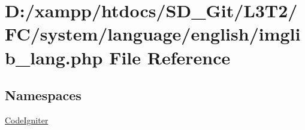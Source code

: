 \hypertarget{system_2language_2english_2imglib__lang_8php}{}\section{D\+:/xampp/htdocs/\+S\+D\+\_\+\+Git/\+L3\+T2/\+F\+C/system/language/english/imglib\+\_\+lang.php File Reference}
\label{system_2language_2english_2imglib__lang_8php}
\subsection*{Namespaces}
\begin{DoxyCompactItemize}
\item 
 \hyperlink{namespace_code_igniter}{Code\+Igniter}
\end{DoxyCompactItemize}
